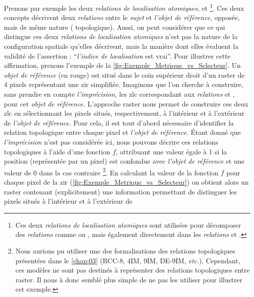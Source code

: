 Prenons par exemple les deux \emph{relations de localisation
  atomiques,}  et
 \footnote{Ces deux \emph{relations de
    localisation atomiques} sont utilisées pour décomposer des
  \emph{relations} comme \protect{}
  ou \protect{}, mais également
  directement dans les \emph{relations}
  \protect{} et
  \protect{}.}. Ces deux concepts
décrivent deux \emph{relations} entre le \emph{sujet} et \emph{l'objet
  de référence,} opposée, mais de même nature (\ie
topologique). Aussi, on peut considérer que ce qui distingue ces deux
\emph{relations de localisation atomiques} n'est pas la nature de la
configuration spatiale qu'elles décrivent, mais la manière dont elles
évaluent la validité de l'assertion : \enquote{\emph{l'indice de
    localisation} est vrai}. Pour illustrer cette affirmation, prenons
l'exemple de la \autoref{fig:Exemple_Metrique_vs_Selecteur}. Un
\emph{objet de référence} (en rouge) est situé dans le coin supérieur
droit d'un raster de 4 pixels représentant une \ac{zir}
simplifiée. Imaginons que l'on cherche à construire, sans prendre en
compte \emph{l'imprécision,} les \ac{zlc} correspondant aux
\emph{relations}  et ,
pour cet \emph{objet de référence.} L'approche raster nous permet de
construire ces deux \ac{zlc} en sélectionnant les pixels situés,
respectivement, à l'intérieur et à l'extérieur de \emph{l'objet de
  référence.} Pour cela, il est tout d'abord nécessaire d'identifier
la relation topologique entre chaque pixel et \emph{l'objet de
  référence.} Étant donné que \emph{l'imprécision} n'est pas
considérée ici, nous pouvons décrire ces relations topologiques à
l'aide d'une fonction \(f\), attribuant une valeur égale à 1 si la
position (représentée par un pixel) est confondue avec \emph{l'objet
  de référence} et une valeur de 0 dans la cas contraire
\footnote{Nous aurions pu utiliser une des formalisations des
  relations topologiques présentées dans le \autoref{chap:03} (RCC-8,
  4IM, 9IM, DE-9IM, \emph{etc.}). Cependant, ces modèles ne sont pas
  destinés à représenter des relations topologiques entre raster. Il
  nous à donc semblé plus simple de ne pas les utiliser pour illustrer
  cet exemple.}. En calculant la valeur de la fonction \(f\) pour
chaque pixel de la \ac{zir}
(\autoref{fig:Exemple_Metrique_vs_Selecteur}) on obtient alors un
raster contenant (explicitement) une information permettant de
distinguer les pixels situés à l'intérieur et à l'extérieur de
